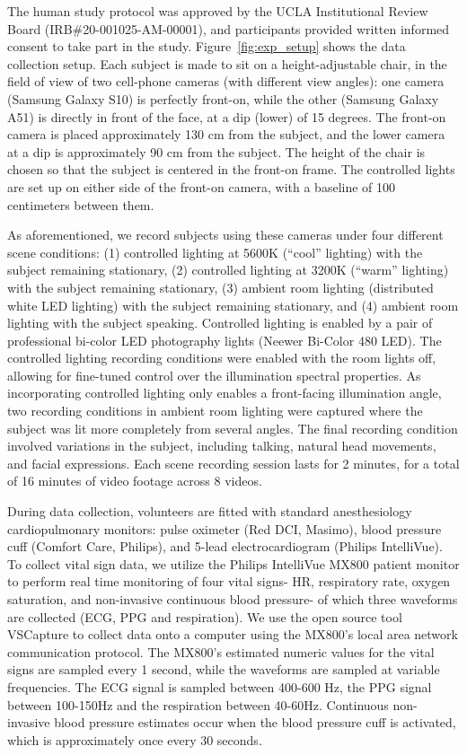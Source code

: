 The human study protocol was approved by the UCLA Institutional Review Board (IRB\#20-001025-AM-00001), and participants provided written informed consent to take part in the study. Figure~\ref{fig:exp_setup} shows the data collection setup. Each subject is made to sit on a height-adjustable chair, in the field of view of two cell-phone cameras (with different view angles): one camera (Samsung Galaxy S10) is perfectly front-on, while the other (Samsung Galaxy A51) is directly in front of the face, at a dip (lower) of 15 degrees. The front-on camera is placed approximately 130 cm from the subject, and the lower camera at a dip is approximately 90 cm from the subject. The height of the chair is chosen so that the subject is centered in the front-on frame. The controlled lights are set up on either side of the front-on camera, with a baseline of 100 centimeters between them.

As aforementioned, we record subjects using these cameras under four different scene conditions: (1) controlled lighting at 5600K (“cool” lighting) with the subject remaining stationary, (2) controlled lighting at 3200K (“warm” lighting) with the subject remaining stationary, (3) ambient room lighting (distributed white LED lighting) with the subject remaining stationary, and (4) ambient room lighting with the subject speaking. Controlled lighting is enabled by a pair of professional bi-color LED photography lights (Neewer Bi-Color 480 LED). The controlled lighting recording conditions were enabled with the room lights off, allowing for fine-tuned control over the illumination spectral properties. As incorporating controlled lighting only enables a front-facing illumination angle, two recording conditions in ambient room lighting were captured where the subject was lit more completely from several angles. The final recording condition involved variations in the subject, including talking, natural head movements, and facial expressions. Each scene recording session lasts for 2 minutes, for a total of 16 minutes of video footage across 8 videos. 

During data collection, volunteers are fitted with standard anesthesiology cardiopulmonary monitors: pulse oximeter (Red DCI, Masimo), blood pressure cuff (Comfort Care, Philips), and 5-lead electrocardiogram (Philips IntelliVue). To collect vital sign data, we utilize the Philips IntelliVue MX800 patient monitor to perform real time monitoring of four vital signs- HR, respiratory rate, oxygen saturation, and non-invasive continuous blood pressure- of which three waveforms are collected (ECG, PPG and respiration). We use the open source tool VSCapture \cite{karippacheril_data_2013} to collect data onto a computer using the MX800’s local area network communication protocol. The MX800’s estimated numeric values for the vital signs are sampled every 1 second, while the waveforms are sampled at variable frequencies. The ECG signal is sampled between 400-600 Hz, the PPG signal between 100-150Hz and the respiration between 40-60Hz.  Continuous non-invasive blood pressure estimates occur when the blood pressure cuff is activated, which is approximately once every 30 seconds. 

